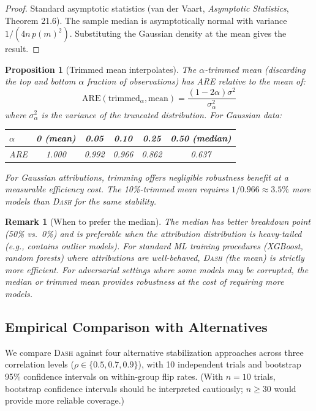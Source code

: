 \documentclass{article}
\newtheorem{proposition}[theorem]{Proposition}
\newtheorem{remark}[theorem]{Remark}
\newcommand{\DASH}{\textsc{Dash}}
\begin{document}
\begin{proof}
Standard asymptotic statistics (van der Vaart, \emph{Asymptotic
Statistics}, Theorem 21.6). The sample median is asymptotically
normal with variance $1/(4n\,p(m)^2)$. Substituting the Gaussian
density at the mean gives the result.
\end{proof}

\begin{proposition}[Trimmed mean interpolates]
\label{prop:trimmed}
The $\alpha$-trimmed mean (discarding the top and bottom $\alpha$
fraction of observations) has ARE relative to the mean of:
\[
    \text{ARE}(\text{trimmed}_\alpha, \text{mean}) =
    \frac{(1-2\alpha)\sigma^2}{\sigma^2_\alpha}
\]
where $\sigma^2_\alpha$ is the variance of the truncated distribution.
For Gaussian data:
\begin{center}
\small
\begin{tabular}{@{}lccccc@{}}
\toprule
$\alpha$ & 0 (mean) & 0.05 & 0.10 & 0.25 & 0.50 (median) \\
\midrule
ARE & 1.000 & 0.992 & 0.966 & 0.862 & 0.637 \\
\bottomrule
\end{tabular}
\end{center}
For Gaussian attributions, trimming offers negligible robustness
benefit at a measurable efficiency cost. The 10\%-trimmed mean
requires $1/0.966 \approx 3.5\%$ more models than \DASH{} for the
same stability.
\end{proposition}

\begin{remark}[When to prefer the median]
The median has better breakdown point (50\% vs.\ 0\%) and is
preferable when the attribution distribution is heavy-tailed
(e.g., contains outlier models). For standard ML training procedures
(XGBoost, random forests) where attributions are well-behaved,
\DASH{} (the mean) is strictly more efficient. For adversarial
settings where some models may be corrupted, the median or trimmed
mean provides robustness at the cost of requiring more models.
\end{remark}

\subsection{Empirical Comparison with Alternatives}
\label{sec:dash-benchmark}

We compare \DASH{} against four alternative stabilization approaches across three correlation levels ($\rho \in \{0.5, 0.7, 0.9\}$), with 10 independent trials and bootstrap 95\% confidence intervals on within-group flip rates. (With $n=10$ trials, bootstrap confidence intervals should be interpreted cautiously; $n \geq 30$ would provide more reliable coverage.)
\end{document}
